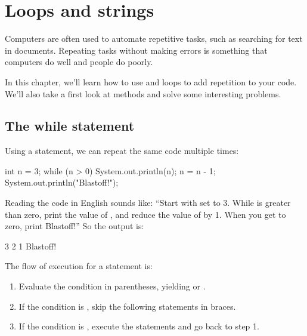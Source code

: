 \chapter{Loops and strings}

Computers are often used to automate repetitive tasks, such as searching for text in documents.
Repeating tasks without making errors is something that computers do well and people do poorly.

In this chapter, we'll learn how to use  and  loops to add repetition to your code.
We'll also take a first look at  methods and solve some interesting problems.



\section{The while statement}


Using a  statement, we can repeat the same code multiple times:

\begin{code}
int n = 3;
while (n > 0) {
    System.out.println(n);
    n = n - 1;
}
System.out.println("Blastoff!");
\end{code}

Reading the code in English sounds like: ``Start with  set to 3.
While  is greater than zero, print the value of , and reduce the value of  by 1.
When you get to zero, print Blastoff!''
So the output is:

\begin{stdout}
3
2
1
Blastoff!
\end{stdout}

The flow of execution for a  statement is:

\begin{enumerate}

\item Evaluate the condition in parentheses, yielding  or .

\item If the condition is , skip the following statements in braces.

\item If the condition is , execute the statements and go back to step 1.

\end{enumerate}

